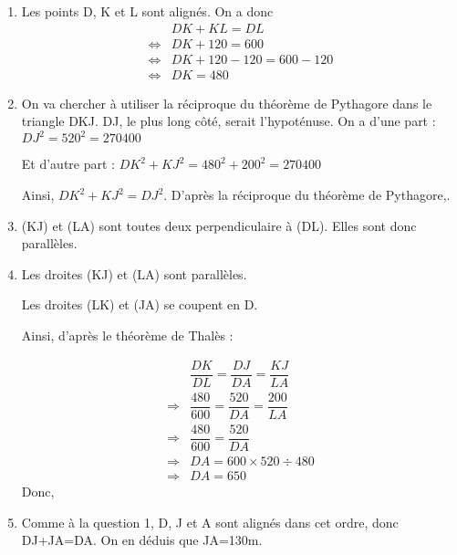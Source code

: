\begin{enumerate}
    \vspace*{1em}\item Les points D, K et L sont alignés. On a donc \begin{align*}
        &DK+KL=DL\\
        \iff & DK+ 120=600\\
        \iff & DK + 120-120=600-120\\
        \iff & DK=480
    \end{align*}

    \vspace*{1em}\item On va chercher à utiliser la réciproque du théorème de Pythagore dans le triangle DKJ.
    DJ, le plus long côté, serait l'hypoténuse. On a d'une part :
    $DJ^2=520^2=270400$
    
    Et d'autre part : 
    $DK^2+KJ^2=480^2+200^2=270400$

    Ainsi, $DK^2+KJ^2=DJ^2$. D'après la réciproque du théorème de Pythagore,.

    \vspace*{1em}\item (KJ) et (LA) sont toutes deux perpendiculaire à (DL). Elles sont donc parallèles.
    
    \vspace*{1em}\item Les droites (KJ) et (LA) sont parallèles.
    
    Les droites (LK) et (JA) se coupent en D. 

    Ainsi, d'après le théorème de Thalès :

    \begin{align*}
        &\dfrac{DK}{DL}=\dfrac{DJ}{DA}=\dfrac{KJ}{LA}\\
        \Rightarrow & \dfrac{480}{600}=\dfrac{520}{DA}=\dfrac{200}{LA}\\
        \Rightarrow & \dfrac{480}{600}=\dfrac{520}{DA}\\
        \Rightarrow & DA=600\times 520 \div 480\\
        \Rightarrow & DA=650
    \end{align*}
    Donc, 

    \vspace*{1em}\item Comme à la question 1, D, J et A sont alignés dans cet ordre, donc DJ+JA=DA. On en déduis que JA=130m.
    
\end{enumerate}

